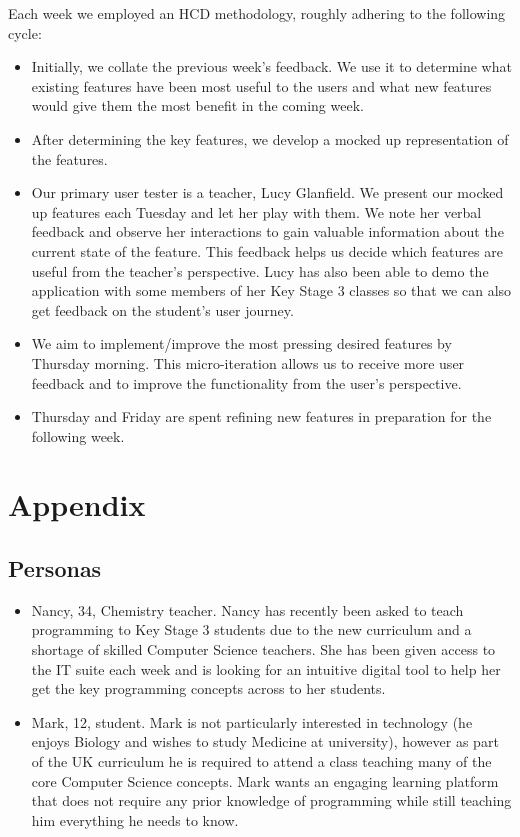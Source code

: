 \documentclass[a4wide, 11pt]{article}
\begin{document}
Each week we employed an HCD methodology, roughly adhering to the following cycle:

\begin{itemize}
  \item Initially, we collate the previous week's feedback. We use it to determine what existing features have been most useful to the users and what new features would give them the most benefit in the coming week.
  \item After determining the key features, we develop a mocked up representation of the features.
  \item Our primary user tester is a teacher, Lucy Glanfield. We present our mocked up features each Tuesday and let her play with them. We note her verbal feedback and observe her interactions to gain valuable information about the current state of the feature. This feedback helps us decide which features are useful from the teacher's perspective. Lucy has also been able to demo the application with some members of her Key Stage 3 classes so that we can also get feedback on the student's user journey.
  \item We aim to implement/improve the most pressing desired features by Thursday morning. This micro-iteration allows us to receive more user feedback and to improve the functionality from the user's perspective.
  \item Thursday and Friday are spent refining new features in preparation for the following week.
\end{itemize}

\section{Appendix}

\subsection{Personas}
\begin{itemize}
  \item Nancy, 34, Chemistry teacher. Nancy has recently been asked to teach programming
  to Key Stage 3 students due to the new curriculum and a shortage of skilled
  Computer Science teachers. She has been given access to the IT suite each week
  and is looking for an intuitive digital tool to help her get the key programming
  concepts across to her students.

  \item Mark, 12, student. Mark is not particularly interested in technology (he enjoys
  Biology and wishes to study Medicine at university), however as part of the UK
  curriculum he is required to attend a class teaching many of the core
  Computer Science concepts. Mark wants an engaging learning platform that
  does not require any prior knowledge of programming while still teaching him
  everything he needs to know.
\end{itemize}
\end{document}
